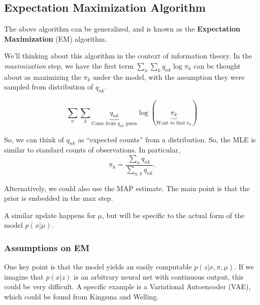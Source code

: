 \documentclass{article}
\begin{document}
\subsection{Expectation Maximization Algorithm}

The above algorithm can be generalized, and is known as the {\bf Expectation Maximization} (EM) algorithm.



\begin{algorithm}[H]
\begin{algorithmic}[1]
  \EndWhile{}
  \EndProcedure{}
\end{algorithmic}
\end{algorithm}


We'll thinking about this algorithm in the context of information theory.  In the \emph{maximization} step, we have the first term $\displaystyle \sum_n \sum_k q_{nk} \log \pi_k$ can be thought about as maximizing the $\pi_k$ under the model, with the assumption they were sampled from distribution of $q_{nk}$. 

\[\sum_n \sum_k \underbrace{{q_{nk}}}_{\text{Came from $q_{nk}$ guess}} \log \left(\underbrace{{\pi_k}}_{\text{Want to find $\pi_k$}}\right) \]

So, we can think of $q_{nk}$ as ``expected counts'' from a distribution.  So, the MLE is similar to standard counts of observations.  In particular,
\[ \pi_k = \frac{\sum\limits_n q_{nk}}{\sum\limits_{n, k} q_{nk}}. \]

Alternatively, we could also use the MAP estimate.  The main point is that the prior is embedded in the max step.

A similar update happens for $\mu$, but will be specific to the actual form of the model $p(x | \mu)$.

\subsubsection{Assumptions on EM}

One key point is that the model yields an easily computable $p(z | x, \pi, \mu)$.  If we imagine that $p(x|z)$ is an arbitrary neural net with continuous output, this could be very difficult.  A specific example is a Variational Autoencoder (VAE), which could be found from Kingsma and Welling.
\end{document}
